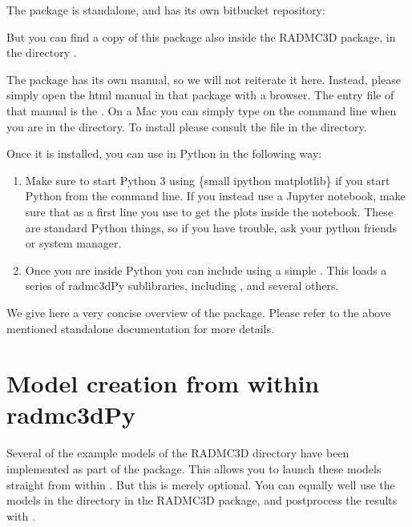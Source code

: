 \documentclass[letterpaper,10pt,english]{sphinxmanual}
\begin{document}
The package is stand\sphinxhyphen{}alone, and has its own bitbucket repository:


But you can find a copy of this package also inside the RADMC\sphinxhyphen{}3D package,
in the directory .

The  package has its own manual, so we will not reiterate it
here. Instead, please simply open the html manual in that package with a
browser. The entry file of that manual is the .  On a
Mac you can simply type  on the command line when you
are in the  directory. To install  please consult the
 file in the  directory.

Once it is installed, you can use  in Python in the following
way:
\begin{enumerate}
%
\item {} 
Make sure to start Python 3 using \{small ipython \textendash{}matplotlib\} if you start
Python from the command line. If you instead use a Jupyter notebook, make
sure that as a first line you use  to get the plots
inside the notebook. These are standard Python things, so if you have
trouble, ask your python friends or system manager.

\item {} 
Once you are inside Python you can include  using a simple
. This loads a series of radmc3dPy sub\sphinxhyphen{}libraries,
including ,  and several others.

\end{enumerate}

We give here a very concise overview of the  package.
Please refer to the above mentioned stand\sphinxhyphen{}alone documentation for more details.


\section{Model creation from within radmc3dPy}
\label{\detokenize{pythontools:model-creation-from-within-radmc3dpy}}
Several of the example models of the RADMC\sphinxhyphen{}3D  directory have been
implemented as part of the  package. This allows you to launch
these models straight from within . But this is merely
optional. You can equally well use the models in the  directory in
the RADMC\sphinxhyphen{}3D package, and post\sphinxhyphen{}process the results with .
\end{document}

